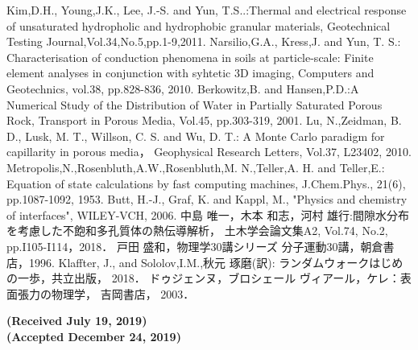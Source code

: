 \documentclass{jsce}
\begin{document}
\begin{thebibliography}{99}
\begin{spacing}{1.175}
	Kim,D.H., Young,J.K., Lee, J.-S. and Yun, T.S..:Thermal and electrical response of unsaturated hydropholic and hydrophobic granular materials,
	 Geotechnical Testing Journal,Vol.34,No.5,pp.1-9,2011.
	Narsilio,G.A., Kress,J. and Yun, T. S.:
	Characterisation of conduction phenomena in soils at particle-scale: 
	Finite element analyses in conjunction with syhtetic 3D imaging, Computers and Geotechnics, vol.38, pp.828-836, 2010.
        Berkowitz,B. and Hansen,P.D.:A Numerical Study of the Distribution of 	Water in Partially Saturated Porous Rock, 
	Transport in Porous Media, Vol.45, pp.303-319, 2001.
        Lu, N.,Zeidman, B. D., Lusk, M. T., Willson, C. S. and Wu, D. T.: 
	A Monte Carlo paradigm for capillarity in porous media， Geophysical Research Letters, Vol.37, L23402, 2010.
	Metropolis,N.,Rosenbluth,A.W.,Rosenbluth,M. N.,Teller,A. H. and	Teller,E.:
		Equation of state calculations by fast computing machines, 
	J.Chem.Phys., 21(6), pp.1087-1092, 1953.
	Butt, H.-J., Graf, K. and Kappl, M., 
	"Physics and chemistry of interfaces", WILEY-VCH, 2006.
	中島 唯一，木本 和志，河村 雄行:間隙水分布を考慮した不飽和多孔質体の熱伝導解析， 
	土木学会論文集A2, Vol.74, No.2, pp.I105-I114，2018．
	戸田 盛和，物理学30講シリーズ 分子運動30講，朝倉書店，1996.
	Klaffter, J., and Sololov,I.M.,秋元 琢磨(訳): 
	ランダムウォークはじめの一歩，共立出版， 2018．
ドゥジェンヌ，ブロシェール ヴィアール，ケレ：表面張力の物理学， 吉岡書店， 2003．
\end{spacing}
\end{thebibliography}
\vspace{-5mm}
\begin{flushright}
	\small
	\bf{ (Received July 19, 2019)\\
	(Accepted December 24, 2019)}
\end{flushright}
\newpage
\lastpagecontrol[1cm]{25.7cm}
\end{document}
